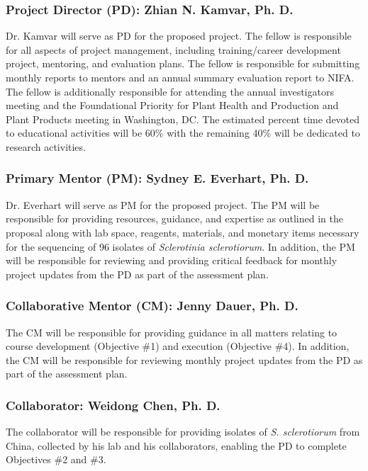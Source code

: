 \documentclass[12pt,letterpaper]{article}
\title{\ruleline{Key Personnel}}
\begin{document}
\maketitle


\subsubsection*{Project Director (PD): Zhian N. Kamvar, Ph. D.}

\noindent Dr. Kamvar will serve as PD for the proposed project. 
The fellow is responsible for all aspects of project management, including training/career development project, mentoring, and evaluation plans. 
The fellow is responsible for submitting monthly reports to mentors and an annual summary evaluation report to NIFA.
The fellow is additionally responsible for attending the annual investigators meeting and the Foundational Priority for Plant Health and Production and Plant Products meeting in Washington, DC.
The estimated percent time devoted to educational activities will be 60\% with the remaining 40\% will be dedicated to research activities. 

\subsubsection*{Primary Mentor (PM): Sydney E. Everhart, Ph. D.}

\noindent Dr. Everhart will serve as PM for the proposed project. 
The PM will be responsible for providing resources, guidance, and expertise as outlined in the proposal along with lab space, reagents, materials, and monetary items necessary for the sequencing of 96 isolates of \textit{Sclerotinia sclerotiorum}. 
In addition, the PM will be responsible for reviewing and providing critical feedback for monthly project updates from the PD as part of the assessment plan. 

\subsubsection*{Collaborative Mentor (CM): Jenny Dauer, Ph. D.}
The CM will be responsible for providing guidance in all matters relating to course development (Objective \#1) and execution (Objective \#4). 
In addition, the CM will be responsible for reviewing monthly project updates from the PD as part of the assessment plan.

\subsubsection*{Collaborator: Weidong Chen, Ph. D.}
The collaborator will be responsible for providing isolates of \textit{S. sclerotiorum} from China, collected by his lab and his collaborators, enabling the PD to complete Objectives \#2 and \#3.
\end{document}
